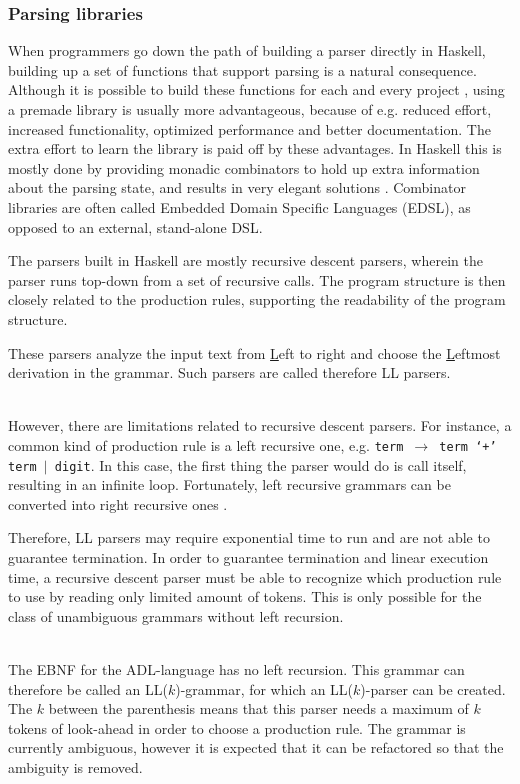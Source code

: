 \subsubsection{Parsing libraries}
%
When programmers go down the path of building a parser directly in Haskell, building up a set of functions that support parsing is a natural consequence.
Although it is possible to build these functions for each and every project , using a premade library is usually more advantageous, because of e.g. reduced effort, increased functionality, optimized performance and better documentation.
The extra effort to learn the library is paid off by these advantages.
In Haskell this is mostly done by providing monadic combinators to hold up extra information about the parsing state, and results in very elegant solutions .
Combinator libraries are often called Embedded Domain Specific Languages (EDSL), as opposed to an external, stand-alone DSL.

The parsers built in Haskell are mostly recursive descent parsers, wherein the parser runs top-down from a set of recursive calls.
The program structure is then closely related to the production rules, supporting the readability of the program structure.

These parsers analyze the input text from \underline{L}eft to right and choose the \underline{L}eftmost derivation in the grammar.
Such parsers are called therefore LL parsers.

~\\
However, there are limitations related to recursive descent parsers.
For instance, a common kind of production rule is a left recursive one, e.g. \texttt{term $\rightarrow$ term `$+$' term $|$ digit}.
In this case, the first thing the parser would do is call itself, resulting in an infinite loop.
Fortunately, left recursive grammars can be converted into right recursive ones .

Therefore, LL parsers may require exponential time to run and are not able to guarantee termination.
In order to guarantee termination and linear execution time, a recursive descent parser must be able to recognize which production rule to use by reading only limited amount of tokens.
This is only possible for the class of unambiguous grammars without left recursion.

~\\
%
%
The EBNF for the ADL-language has no left recursion.
This grammar can therefore be called an LL($k$)-grammar, for which an LL($k$)-parser can be created.
The $k$ between the parenthesis means that this parser needs a maximum of $k$ tokens of look-ahead in order to choose a production rule.
The grammar is currently ambiguous, however it is expected that it can be refactored so that the ambiguity is removed.

